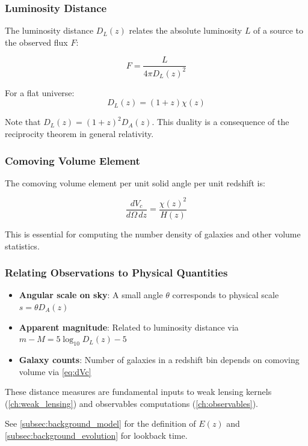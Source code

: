 \subsubsection{Luminosity Distance}

The luminosity distance $D_L(z)$ relates the absolute luminosity $L$ of a source to the observed flux $F$:

\begin{equation}
F = \frac{L}{4\pi D_L(z)^2}
\end{equation}

For a flat universe:
\begin{equation}
D_L(z) = (1+z) \chi(z)
\label{eq:D_L}
\end{equation}

Note that $D_L(z) = (1+z)^2 D_A(z)$. This duality is a consequence of the reciprocity theorem in general relativity.

\subsubsection{Comoving Volume Element}

The comoving volume element per unit solid angle per unit redshift is:

\begin{equation}
\frac{dV_c}{d\Omega \, dz} = \frac{\chi(z)^2}{H(z)}
\label{eq:dVc}
\end{equation}

This is essential for computing the number density of galaxies and other volume statistics.


\subsubsection{Relating Observations to Physical Quantities}

\begin{itemize}
    \item \textbf{Angular scale on sky}: A small angle $\theta$ corresponds to physical scale $s = \theta D_A(z)$
    \item \textbf{Apparent magnitude}: Related to luminosity distance via $m - M = 5 \log_{10} D_L(z) - 5$
    \item \textbf{Galaxy counts}: Number of galaxies in a redshift bin depends on comoving volume via \cref{eq:dVc}
\end{itemize}

These distance measures are fundamental inputs to weak lensing kernels (\cref{ch:weak_lensing}) and observables computations (\cref{ch:observables}).

See \cref{subsec:background_model} for the definition of $E(z)$ and \cref{subsec:background_evolution} for lookback time.
